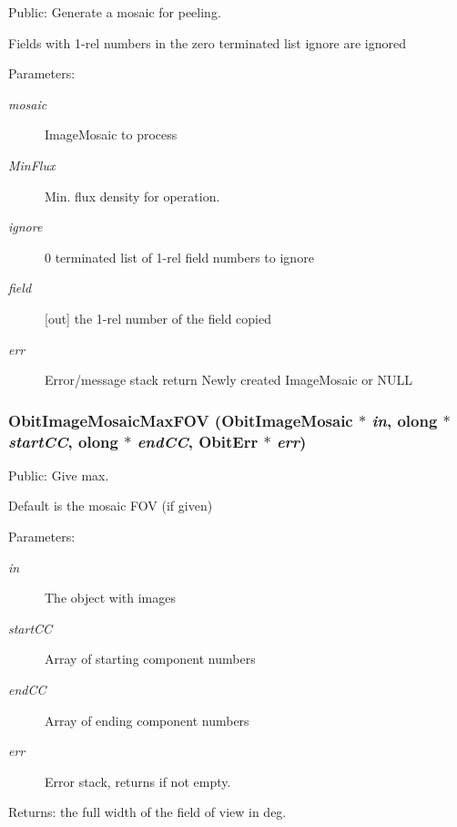 Public: Generate a mosaic for peeling. 

Fields with 1-rel numbers in the zero terminated list ignore are ignored \begin{Desc}
\item[Parameters:]
\begin{description}
\item[{\em mosaic}]Image\-Mosaic to process \item[{\em Min\-Flux}]Min. flux density for operation. \item[{\em ignore}]0 terminated list of 1-rel field numbers to ignore \item[{\em field}][out] the 1-rel number of the field copied \item[{\em err}]Error/message stack return Newly created Image\-Mosaic or NULL \end{description}
\end{Desc}
\subsubsection{ Obit\-Image\-Mosaic\-Max\-FOV ({\bf Obit\-Image\-Mosaic} $\ast$ {\em in}, {\bf olong} $\ast$ {\em start\-CC}, {\bf olong} $\ast$ {\em end\-CC}, {\bf Obit\-Err} $\ast$ {\em err})}\label{ObitImageMosaic_8h_a21}


Public: Give max. 

Default is the mosaic FOV (if given) \begin{Desc}
\item[Parameters:]
\begin{description}
\item[{\em in}]The object with images \item[{\em start\-CC}]Array of starting component numbers \item[{\em end\-CC}]Array of ending component numbers \item[{\em err}]Error stack, returns if not empty. \end{description}
\end{Desc}
\begin{Desc}
\item[Returns:]the full width of the field of view in deg. \end{Desc}
